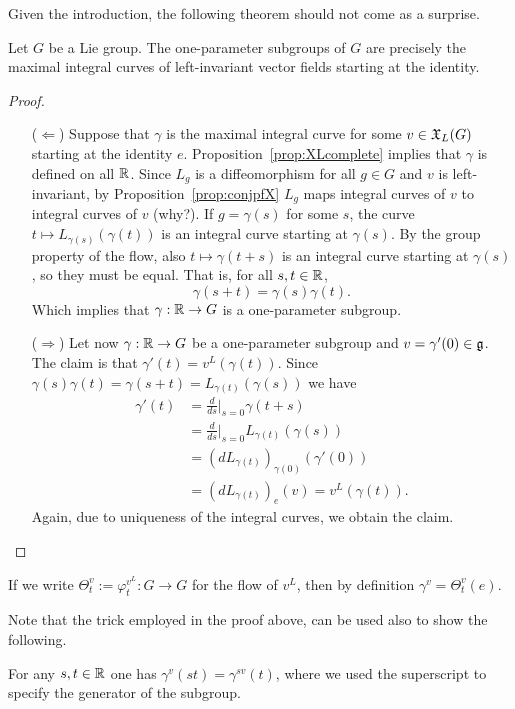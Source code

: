 Given the introduction, the following theorem should not come as a surprise.
\begin{theorem}
  Let $G$ be a Lie group.
  The one-parameter subgroups of $G$ are precisely the maximal integral curves of left-invariant vector fields starting at the identity.
\end{theorem}
\begin{proof}
  \begin{itemize}
    \item[($\Longleftarrow$)]
    Suppose that $\gamma$ is the maximal integral curve for some $v\in\mathfrak{X}_L(G)$ starting at the identity $e$. 
    Proposition~\ref{prop:XLcomplete} implies that $\gamma$ is defined on all $\mathbb{R}$. Since $L_g$ is a diffeomorphism for all $g\in G$ and $v$ is left-invariant, by Proposition~\ref{prop:conjpfX} $L_g$ maps integral curves of $v$ to integral curves of $v$ (why?).
    If $g=\gamma(s)$ for some $s$, the curve $t\mapsto L_{\gamma(s)}(\gamma(t))$ is an integral curve starting at $\gamma(s)$.
    By the group property of the flow, also $t\mapsto \gamma(t+s)$ is an integral curve starting at $\gamma(s)$, so they must be equal.
    That is, for all $s,t\in \mathbb{R}$,
    \begin{equation}
      \gamma(s+t) = \gamma(s)\gamma(t).
    \end{equation}
    Which implies that $\gamma:\mathbb{R}\to G$ is a one-parameter subgroup.
    \item[($\Longrightarrow$)] Let now $\gamma:\mathbb{R}\to G$ be a one-parameter subgroup and $v = \gamma'(0)\in \mathfrak{g}$.
    The claim is that $\gamma'(t) = v^L(\gamma(t))$.
    Since $\gamma(s)\gamma(t) = \gamma(s+t) = L_{\gamma(t)}(\gamma(s))$ we have
    \begin{align}
      \gamma'(t) &= \frac{d}{ds}\Big|_{s=0} \gamma(t+s) \\
      &= \frac{d}{ds}\Big|_{s=0} L_{\gamma(t)}(\gamma(s)) \\
      &= (dL_{\gamma(t)})_{\gamma(0)}(\gamma'(0)) \\
      &= (dL_{\gamma(t)})_{e}(v)
      = v^L(\gamma(t)).
    \end{align}
    Again, due to uniqueness of the integral curves, we obtain the claim.
  \end{itemize}
\end{proof}

If we write $\Theta_t^v:=\varphi^{v^L}_t:G\to G$ for the flow of $v^L$, then by definition $\gamma^v = \Theta_t^v(e)$.

Note that the trick employed in the proof above, can be used also to show the following.
\begin{lemma}
  For any $s,t\in\mathbb{R}$ one has $\gamma^v(st) = \gamma^{sv}(t)$, where we used the superscript to specify the generator of the subgroup.
\end{lemma}

